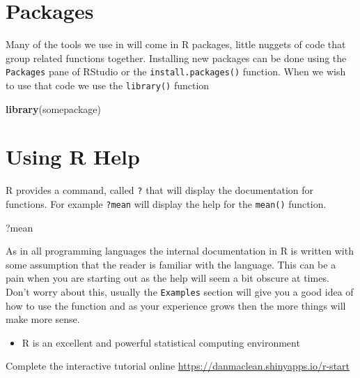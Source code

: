 \documentclass[
]{book}
\newenvironment{Shaded}{\begin{snugshade}}{\end{snugshade}}
\newcommand{\KeywordTok}[1]{\textcolor[rgb]{0.13,0.29,0.53}{\textbf{#1}}}
\newcommand{\NormalTok}[1]{#1}
\providecommand{\tightlist}{%
  \setlength{\itemsep}{0pt}\setlength{\parskip}{0pt}}
\newenvironment{task}
{ \begin{tcolorbox}[title=For you to do,title filled] }
{  \end{tcolorbox} }
\newenvironment{roundup}
{ \begin{tcolorbox}[colbacktitle=yellow!50!white,
title=Round Up,coltitle=black,
fonttitle=\bfseries] }
{  \end{tcolorbox} }
\begin{document}
\hypertarget{packages}{%
\section{Packages}\label{packages}}

Many of the tools we use in will come in R packages, little nuggets of code that group related functions together. Installing new packages can be done using the \texttt{Packages} pane of RStudio or the \texttt{install.packages()} function. When we wish to use that code we use the \texttt{library()} function

\begin{Shaded}
\begin{Highlighting}[]
\KeywordTok{library}\NormalTok{(somepackage)}
\end{Highlighting}
\end{Shaded}

\hypertarget{using-r-help}{%
\section{Using R Help}\label{using-r-help}}

R provides a command, called \texttt{?} that will display the documentation for functions. For example \texttt{?mean} will display the help for the \texttt{mean()} function.

\begin{Shaded}
\begin{Highlighting}[]
\NormalTok{?mean}
\end{Highlighting}
\end{Shaded}

As in all programming languages the internal documentation in R is written with some assumption that the reader is familiar with the language. This can be a pain when you are starting out as the help will seem a bit obscure at times. Don't worry about this, usually the \texttt{Examples} section will give you a good idea of how to use the function and as your experience grows then the more things will make more sense.

\begin{roundup}
\begin{itemize}
\tightlist
\item
  R is an excellent and powerful statistical computing environment
\end{itemize}
\end{roundup}

\begin{task}
Complete the interactive tutorial online \url{https://danmaclean.shinyapps.io/r-start}
\end{task}
\end{document}
